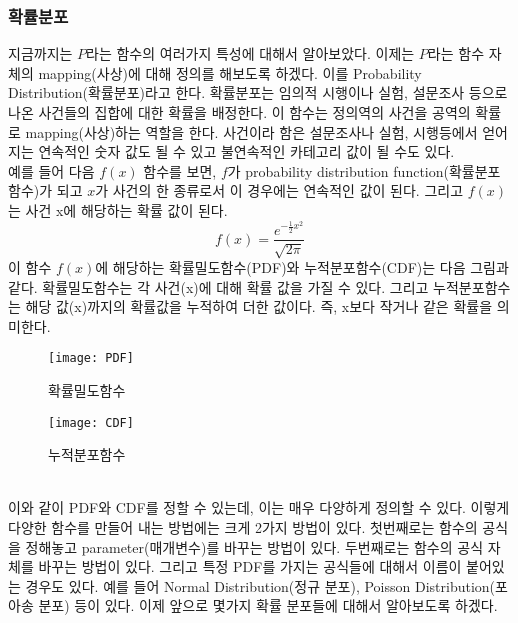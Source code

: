 \documentclass[a4paper]{oblivoir}
\begin{document}
\subsubsection{확률분포}
\indent 지금까지는 $P$라는 함수의 여러가지 특성에 대해서 알아보았다. 이제는 $P$라는 함수 자체의 mapping(사상)에 대해 정의를 해보도록 하겠다. 이를 Probability Distribution(확률분포)라고 한다. 확률분포는 임의적 시행이나 실험, 설문조사 등으로 나온 사건들의 집합에 대한 확률을 배정한다. 이 함수는 정의역의 사건을 공역의 확률로 mapping(사상)하는 역할을 한다. 사건이라 함은 설문조사나 실험, 시행등에서 얻어지는 연속적인 숫자 값도 될 수 있고 불연속적인 카테고리 값이 될 수도 있다. \\
\indent 예를 들어 다음 $f(x)$ 함수를 보면, $f$가 probability distribution function(확률분포함수)가 되고 $x$가 사건의 한 종류로서 이 경우에는 연속적인 값이 된다. 그리고 $f(x)$는 사건 x에 해당하는 확률 값이 된다.\\
\begin{equation}
f(x)=\frac{e^{-\frac{1}{2} x^2}}{\sqrt{2\pi}}
\end{equation}
\indent 이 함수 $f(x)$에 해당하는 확률밀도함수(PDF)와 누적분포함수(CDF)는 다음 그림과 같다. 확률밀도함수는 각 사건(x)에 대해 확률 값을 가질 수 있다. 그리고 누적분포함수는 해당 값(x)까지의 확률값을 누적하여 더한 값이다. 즉, x보다 작거나 같은 확률을 의미한다.
\begin{figure}[ht]\centering
\parbox[t]{4cm}{\texttt{[image: PDF]}\caption{확률밀도함수}\label{Fig:1-24}}\hspace{1cm}
\parbox[t]{4cm}{\texttt{[image: CDF]}\caption{누적분포함수}\label{Fig:1-25}}
\end{figure}\\

\indent 이와 같이 PDF와 CDF를 정할 수 있는데, 이는 매우 다양하게 정의할 수 있다. 이렇게 다양한 함수를 만들어 내는 방법에는 크게 2가지 방법이 있다. 첫번째로는 함수의 공식을 정해놓고 parameter(매개변수)를 바꾸는 방법이 있다. 두번째로는 함수의 공식 자체를 바꾸는 방법이 있다. 그리고 특정 PDF를 가지는 공식들에 대해서 이름이 붙어있는 경우도 있다. 예를 들어 Normal Distribution(정규 분포), Poisson Distribution(포아송 분포) 등이 있다. 이제 앞으로 몇가지 확률 분포들에 대해서 알아보도록 하겠다.\\
\end{document}
